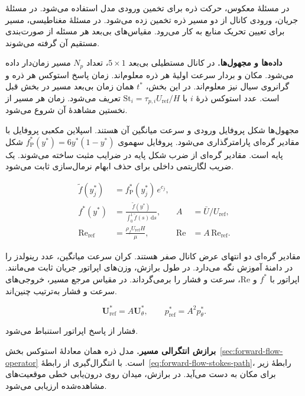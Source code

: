 \label{sec:theory-inverse-problems}

در مسئلهٔ معکوس، حرکت ذره برای تخمین ورودی مدل استفاده می‌شود.
در مسئلهٔ جریان، ورودی کانال از دو مسیر ذره تخمین زده می‌شود.
در مسئلهٔ مغناطیسی، مسیر برای تعیین تحریک منابع به کار می‌رود.
مقیاس‌های بی‌بعد هر مسئله از صورت‌بندی مستقیم آن گرفته می‌شوند.

\label{sec:inverse-flow-timed}

\textbf{داده‌ها و مجهول‌ها.}
در کانال مستطیلی بی‌بعد $5\times1$، تعداد $N_p$ مسیر زمان‌دار داده می‌شود.
مکان و بردار سرعت اولیهٔ هر ذره معلوم‌اند.
زمان پاسخ استوکس هر ذره و گرانروی سیال نیز معلوم‌اند.
در این بخش، $t^*$ همان زمان بی‌بعد مسیر در بخش قبل است.
عدد استوکس ذرهٔ $i$ با $\mathrm{St}_i=\tau_{p,i}U_{\mathrm{ref}}/H$ تعریف می‌شود.
زمان هر مسیر از نخستین مشاهدهٔ آن شروع می‌شود.

مجهول‌ها شکل پروفایل ورودی و سرعت میانگین آن هستند.
اسپلاین مکعبی پروفایل با مقادیر گره‌ای پارامترگذاری می‌شود.
پروفایل سهموی $f_{\mathrm P}^*(y^*)=6y^*(1-y^*)$ شکل پایه است.
مقادیر گره‌ای از ضرب شکل پایه در ضرایب مثبت ساخته می‌شوند.
یک ضریب لگاریتمی داخلی برای حذف ابهام نرمال‌سازی ثابت می‌شود.

\begin{equation}
\begin{aligned}
\widetilde f(y_j^*)&= f_{\mathrm P}^*(y_j^*)\,e^{c_j},\\
f^*(y^*)&=\frac{\widetilde f(y^*)}{\int_0^1\widetilde f(s)\,\mathrm ds},
& A&=\bar U/U_{\mathrm{ref}},\\
\mathrm{Re}_{\mathrm{ref}}&=\frac{\rho_f U_{\mathrm{ref}}H}{\mu},
& \mathrm{Re}&=A\,\mathrm{Re}_{\mathrm{ref}} .
\end{aligned}
\label{eq:inverse-flow-parameterization}
\end{equation}

مقادیر گره‌ای دو انتهای عرض کانال صفر هستند.
کران سرعت میانگین، عدد رینولدز را در دامنهٔ آموزش نگه می‌دارد.
در طول برازش، وزن‌های اپراتور جریان ثابت می‌مانند.
اپراتور با $f^*$ و $\mathrm{Re}$، سرعت و فشار را برمی‌گرداند.
در مقیاس مرجع مسیر، خروجی‌های سرعت و فشار به‌ترتیب چنین‌اند.

\[
\mathbf U_{\mathrm{ref}}^*=A\mathbf U_\theta^*,
\qquad
p_{\mathrm{ref}}^*=A^2p_\theta^*.
\]

فشار از پاسخ اپراتور استنباط می‌شود.

\textbf{برازش انتگرالی مسیر.}
مدل ذره همان معادلهٔ استوکس بخش~\ref{sec:forward-flow-operator} است.
با انتگرال‌گیری از رابطهٔ~\eqref{eq:forward-flow-stokes-path}، رابطهٔ زیر برای مکان به دست می‌آید.
در برازش، میدان روی درون‌یابی خطی موقعیت‌های مشاهده‌شده ارزیابی می‌شود.

